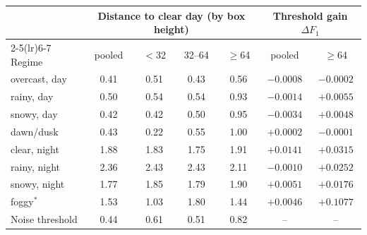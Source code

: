 \begin{tabular}{lcccccc}
\toprule
 & \multicolumn{4}{c}{Distance to clear day (by box height)} & \multicolumn{2}{c}{Threshold gain $\Delta F_1$} \\
\cmidrule(lr){2-5}\cmidrule(lr){6-7}
Regime & pooled & $<$32 & 32--64 & $\geq$64 & pooled & $\geq$64 \\
\midrule
overcast, day & 0.41 & 0.51 & 0.43 & 0.56 & $-0.0008$ & $-0.0002$ \\
rainy, day & 0.50 & 0.54 & 0.54 & 0.93 & $-0.0014$ & $+0.0055$ \\
snowy, day & 0.42 & 0.42 & 0.50 & 0.95 & $-0.0034$ & $+0.0048$ \\
dawn/dusk & 0.43 & 0.22 & 0.55 & 1.00 & $+0.0002$ & $-0.0001$ \\
clear, night & 1.88 & 1.83 & 1.75 & 1.91 & $+0.0141$ & $+0.0315$ \\
rainy, night & 2.36 & 2.43 & 2.43 & 2.11 & $-0.0010$ & $+0.0252$ \\
snowy, night & 1.77 & 1.85 & 1.79 & 1.90 & $+0.0051$ & $+0.0176$ \\
foggy$^\ast$ & 1.53 & 1.03 & 1.80 & 1.44 & $+0.0046$ & $+0.1077$ \\
\midrule
Noise threshold & 0.44 & 0.61 & 0.51 & 0.82 & -- & -- \\
\bottomrule
\end{tabular}
